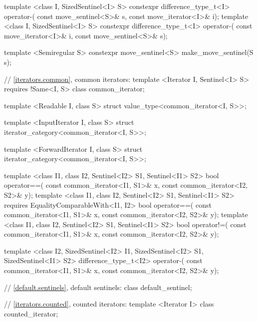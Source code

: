 \begin{codeblock}
{{{{  template <class I, SizedSentinel<I> S>
    constexpr difference_type_t<I> operator-(
      const move_sentinel<S>& s, const move_iterator<I>& i);
  template <class I, SizedSentinel<I> S>
    constexpr difference_type_t<I> operator-(
      const move_iterator<I>& i, const move_sentinel<S>& s);

  template <Semiregular S>
    constexpr move_sentinel<S> make_move_sentinel(S s);

  // \ref{iterators.common}, common iterators:
  template <Iterator I, Sentinel<I> S>
    requires !Same<I, S>
  class common_iterator;

  template <Readable I, class S>
  struct value_type<common_iterator<I, S>>;

  template <InputIterator I, class S>
  struct iterator_category<common_iterator<I, S>>;

  template <ForwardIterator I, class S>
  struct iterator_category<common_iterator<I, S>>;

  template <class I1, class I2, Sentinel<I2> S1, Sentinel<I1> S2>
  bool operator==(
    const common_iterator<I1, S1>& x, const common_iterator<I2, S2>& y);
  template <class I1, class I2, Sentinel<I2> S1, Sentinel<I1> S2>
    requires EqualityComparableWith<I1, I2>
  bool operator==(
    const common_iterator<I1, S1>& x, const common_iterator<I2, S2>& y);
  template <class I1, class I2, Sentinel<I2> S1, Sentinel<I1> S2>
  bool operator!=(
    const common_iterator<I1, S1>& x, const common_iterator<I2, S2>& y);

  template <class I2, SizedSentinel<I2> I1, SizedSentinel<I2> S1, SizedSentinel<I1> S2>
  difference_type_t<I2> operator-(
    const common_iterator<I1, S1>& x, const common_iterator<I2, S2>& y);

  // \ref{default.sentinels}, default sentinels:
  class default_sentinel;

  // \ref{iterators.counted}, counted iterators:
  template <Iterator I> class counted_iterator;

}}}}
\end{codeblock}
